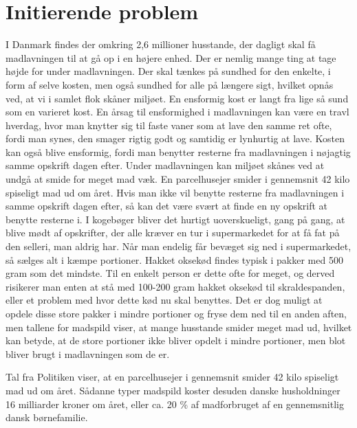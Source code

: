 \section{Initierende problem}
\label{sec:initierendeproblem}

I Danmark findes der omkring 2,6 millioner husstande\cite{husstande}, der dagligt skal få madlavningen til at gå op i en højere enhed. Der er nemlig mange ting at tage højde for under madlavningen. Der skal tænkes på sundhed for den enkelte, i form af selve kosten, men også sundhed for alle på længere sigt, hvilket opnås ved, at vi i samlet flok skåner miljøet.
En ensformig kost er langt fra lige så sund som en varieret kost. En årsag til ensformighed i madlavningen kan være en travl hverdag, hvor man knytter sig til faste vaner som \fx at lave den samme ret ofte, fordi man synes, den smager rigtig godt og samtidig er lynhurtig at lave. Kosten kan også blive ensformig, fordi man benytter resterne fra madlavningen i nøjagtig samme opskrift dagen efter.
Under madlavningen kan miljøet skånes ved at undgå at smide for meget mad væk. En parcelhusejer smider i gennemsnit 42 kilo spiseligt mad ud om året. \cite{madspildpol} Hvis man ikke vil benytte resterne fra madlavningen i samme opskrift dagen efter, så kan det være svært at finde en ny opskrift at benytte resterne i. I kogebøger bliver det hurtigt uoverskueligt, gang på gang, at blive mødt af opskrifter, der alle kræver en tur i supermarkedet for at få fat på den selleri, man aldrig har. Når man endelig får bevæget sig ned i supermarkedet, så sælges alt i kæmpe portioner. Hakket oksekød findes typisk i pakker med 500 gram som det mindste. Til en enkelt person er dette ofte for meget, og derved risikerer man enten at stå med 100-200 gram hakket oksekød til skraldespanden, eller et problem med hvor dette kød nu skal benyttes. Det er dog muligt at opdele disse store pakker i mindre portioner og fryse dem ned til en anden aften, men tallene for madspild viser, at mange husstande smider meget mad ud, hvilket kan betyde, at de store portioner ikke bliver opdelt i mindre portioner, men blot bliver brugt i madlavningen som de er.

Tal fra Politiken viser, at en parcelhusejer i gennemsnit smider 42 kilo spiseligt mad ud om året. \cite{madspildpol}
Sådanne typer madspild koster desuden danske husholdninger 16 milliarder kroner om året, eller ca. 20 \% af madforbruget af en gennemsnitlig dansk børnefamilie. \cite{madspild16}
